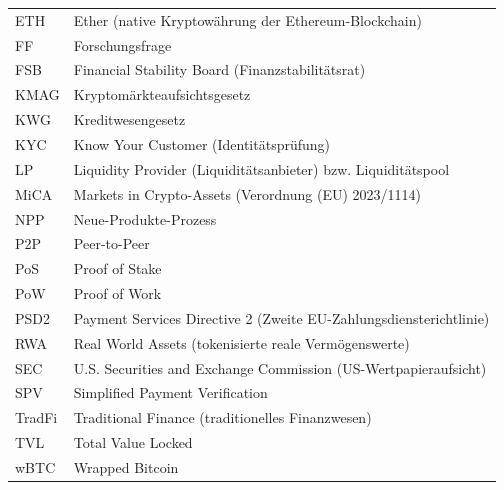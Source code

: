 \documentclass[12pt,a4paper,oneside,BCOR=0mm]{scrreprt}
\begin{document}
\begin{longtable}{@{}p{2.6cm}p{11.8cm}@{}}
ETH   & Ether (native Kryptowährung der Ethereum-Blockchain) \\
FF    & Forschungsfrage \\
FSB   & Financial Stability Board (Finanzstabilitätsrat) \\
KMAG  & Kryptomärkteaufsichtsgesetz \\
KWG   & Kreditwesengesetz \\
KYC   & Know Your Customer (Identitätsprüfung) \\
LP    & Liquidity Provider (Liquiditätsanbieter) bzw. Liquiditätspool \\
MiCA  & Markets in Crypto-Assets (Verordnung (EU) 2023/1114) \\
NPP   & Neue-Produkte-Prozess \\
P2P   & Peer-to-Peer \\
PoS   & Proof of Stake \\
PoW   & Proof of Work \\
PSD2  & Payment Services Directive 2 (Zweite EU-Zahlungsdiensterichtlinie) \\
RWA   & Real World Assets (tokenisierte reale Vermögenswerte) \\
SEC   & U.S. Securities and Exchange Commission (US-Wertpapieraufsicht) \\
SPV   & Simplified Payment Verification \\
TradFi & Traditional Finance (traditionelles Finanzwesen) \\
TVL   & Total Value Locked \\
wBTC  & Wrapped Bitcoin \\
\end{longtable}
\clearpage








\appendix


\printbibliography
\end{document}
